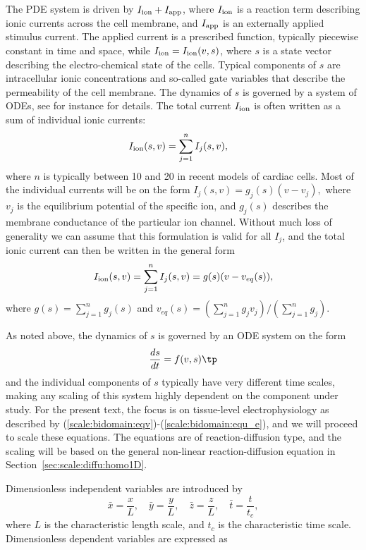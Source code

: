 \documentclass[graybox,envcountchap,sectrefs,final]{svmonodo}
\begin{document}
The PDE system is driven by $I_{\rm{ion}} + I_{\rm{app}}$, where
$I_{\rm{ion}}$ is a reaction term describing ionic currents across the
cell membrane, and $ I_{\rm{app}}$ is an externally applied stimulus
current. The applied current is a prescribed function,
typically piecewise constant in time and space, while
$I_{\rm{ion}} = I_{\rm{ion}}(v,s)$, where $s$ is a state vector
describing the electro-chemical state of the cells. Typical components
of $s$ are intracellular ionic concentrations and so-called gate variables that
describe the permeability of the cell membrane. The dynamics of $s$ is
governed by a system of ODEs, see for instance \cite{Sundnes_2006} for
details. The total
current $I_{\rm{ion}}$ is often written as a sum of individual
ionic currents:
\begin{align} I_{\rm{ion}}(s,v) &= \sum_{j=1}^n I_{j}(s,v), 
\label{scale:bidomain:ion1}
\end{align}
where $n$ is typically between 10 and 20 in recent models of cardiac
cells. Most of the individual currents will be on the form
$ I_{j}(s,v) = g_j(s)(v-v_j), $
where $v_j$ is the equilibrium potential of the specific ion, and
$g_j(s)$ describes the membrane conductance of the particular ion channel. Without
much loss of generality we can assume that this formulation is valid
for all $I_{j}$, and the total ionic current can then be written in the
general form
\[
I_{\rm{ion}}(s,v) = \sum_{j=1}^n I_{j}(s,v) = g(s)(v-v_{eq}(s)) ,
\]
where $g(s) = \sum_{j=1}^n g_j(s)$ and $v_{eq}(s) = (\sum_{j=1}^n g_j
v_j)/(\sum_{j=1}^n g_j)$.

As noted above, the dynamics of $s$ is governed by an ODE system on
the form
\[
\frac{ds}{dt} = f(v,s) \tp
\]
and the individual components of $s$ typically have very
different time scales, making any scaling of this system highly dependent on the
component under study. For the present text, the focus is on
tissue-level electrophysiology as described by
(\ref{scale:bidomain:eqv})-(\ref{scale:bidomain:equ_e}), and we will proceed
to scale these equations. The equations are of
reaction-diffusion type, and the scaling will be based on the general
non-linear reaction-diffusion equation in Section~\ref{sec:scale:diffu:homo1D}.

Dimensionless independent variables are introduced by
\[ \bar x = \frac{x}{L},\quad
\bar y = \frac{y}{L},\quad \bar z = \frac{z}{L},\quad
\bar t = \frac{t}{t_c},\]
where $L$ is the characteristic length scale, and $t_c$ is the
characteristic time scale. Dimensionless dependent variables are
expressed as
\end{document}
